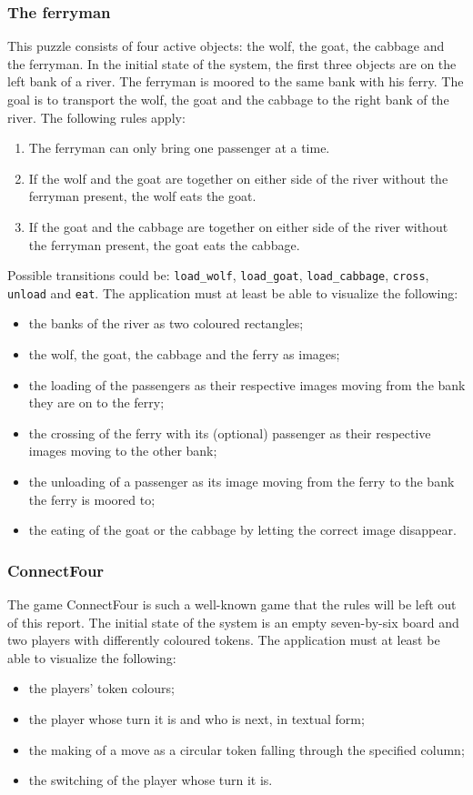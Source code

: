 \documentclass[a4paper]{article}
\begin{document}
	\subsubsection{The ferryman}
	This puzzle consists of four active objects: the wolf, the goat, the cabbage and the ferryman. In the initial state of the system, the first three objects are on the left bank of a river. The ferryman is moored to the same bank with his ferry. The goal is to transport the wolf, the goat and the cabbage to the right bank of the river. The following rules apply:
	\begin{enumerate}
		\item The ferryman can only bring one passenger at a time.
		\item If the wolf and the goat are together on either side of the river without the ferryman present, the wolf eats the goat.
		\item If the goat and the cabbage are together on either side of the river without the ferryman present, the goat eats the cabbage.
	\end{enumerate}
	Possible transitions could be: \lstinline{load_wolf}, \lstinline{load_goat}, \lstinline{load_cabbage}, \lstinline{cross}, \lstinline{unload} and \lstinline{eat}. The application must at least be able to visualize the following:
	\begin{itemize}
		\item the banks of the river as two coloured rectangles;
		\item the wolf, the goat, the cabbage and the ferry as images;
		\item the loading of the passengers as their respective images moving from the bank they are on to the ferry;
		\item the crossing of the ferry with its (optional) passenger as their respective images moving to the other bank;
		\item the unloading of a passenger as its image moving from the ferry to the bank the ferry is moored to;
		\item the eating of the goat or the cabbage by letting the correct image disappear.
	\end{itemize}
	
	\subsubsection{ConnectFour}
	The game ConnectFour is such a well-known game that the rules will be left out of this report. The initial state of the system is an empty seven-by-six board and two players with differently coloured tokens. The application must at least be able to visualize the following:
	\begin{itemize}
		\item the players' token colours; 
		\item the player whose turn it is and who is next, in textual form;
		\item the making of a move as a circular token falling through the specified column;
		\item the switching of the player whose turn it is.
	\end{itemize}
	
\end{document}
